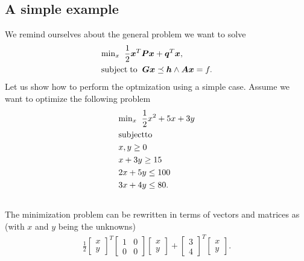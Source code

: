 \documentclass[letterpaper,10pt,english]{sphinxmanual}
\begin{document}
\subsection{A simple example}
\label{\detokenize{chapter7:a-simple-example}}
We remind ourselves about the general problem we want to solve
\begin{equation*}
\begin{split}
\begin{align*}
    &\mathrm{min}_{x}\hspace{0.2cm} \frac{1}{2}\boldsymbol{x}^T\boldsymbol{P}\boldsymbol{x}+\boldsymbol{q}^T\boldsymbol{x},\\ \nonumber
    &\mathrm{subject\hspace{0.1cm} to} \hspace{0.2cm} \boldsymbol{G}\boldsymbol{x} \preceq \boldsymbol{h} \wedge  \boldsymbol{A}\boldsymbol{x}=f.
\end{align*}
\end{split}
\end{equation*}
Let us show how to perform the optmization using a simple case. Assume we want to optimize the following problem
\begin{equation*}
\begin{split}
\begin{align*}
    &\mathrm{min}_{x}\hspace{0.2cm} \frac{1}{2}x^2+5x+3y \\ \nonumber
    &\mathrm{subject to} \\ \nonumber
    &x, y \geq 0 \\ \nonumber
    &x+3y  \geq 15 \\ \nonumber
    &2x+5y  \leq  100 \\ \nonumber
    &3x+4y  \leq  80.  \\ \nonumber
\end{align*}
\end{split}
\end{equation*}
The minimization problem can be rewritten in terms of vectors and matrices as (with \(x\) and \(y\) being the unknowns)
\begin{equation*}
\begin{split}
\frac{1}{2}\begin{bmatrix} x\\ y \end{bmatrix}^T   \begin{bmatrix} 1 & 0\\ 0 & 0  \end{bmatrix}  \begin{bmatrix} x \\ y \end{bmatrix}  + \begin{bmatrix}3\\ 4  \end{bmatrix}^T \begin{bmatrix}x \\ y  \end{bmatrix}.
\end{split}
\end{equation*}
\end{document}
